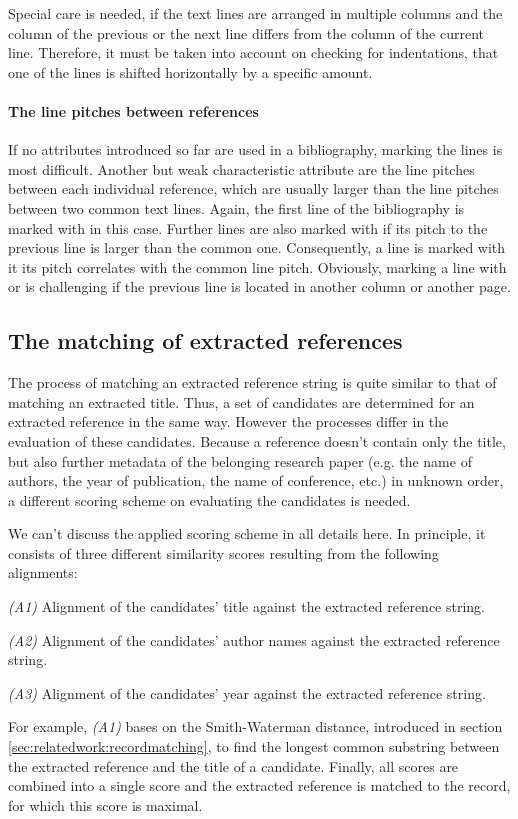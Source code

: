 Special care is needed, if the text lines are arranged in multiple columns and the column of the previous or the next line differs from the column of the current line. Therefore, it must be taken into account on checking for indentations, that one of the lines is shifted horizontally by a specific amount.

\paragraph{The line pitches between references}
If no attributes introduced so far are used in a bibliography, marking the lines is most difficult. Another but weak characteristic attribute are the line pitches between each individual reference, which are usually larger than the line pitches between two common text lines. Again, the first line of the bibliography is marked with  in this case. Further lines are also marked with  if its pitch to the previous line is larger than the common one. Consequently, a line is marked with  it its pitch correlates with the common line pitch. Obviously, marking a line with  or  is challenging if the previous line is located in another column or another page.

\subsection{The matching of extracted references} \label{sec:matching:references}
The process of matching an extracted reference string is quite similar to that of matching an extracted title. Thus, a set of candidates are determined for an extracted reference in the same way. However the processes differ in the evaluation of these candidates. Because a reference doesn't contain only the title, but also further metadata of the belonging research paper (e.g. the name of authors, the year of publication, the name of conference, etc.) in unknown order, a different scoring scheme on evaluating the candidates is needed.

We can't discuss the applied scoring scheme in all details here. In principle, it consists of three different similarity scores resulting from the following alignments: 

\par\medskip\noindent
\textit{(A1)} Alignment of the candidates' title against the extracted reference string.
\par\smallskip\noindent
\textit{(A2)} Alignment of the candidates' author names against the extracted reference string.
\par\smallskip\noindent
\textit{(A3)} Alignment of the candidates' year against the extracted reference string.
\medskip

For example, \textit{(A1)} bases on the Smith-Waterman distance, introduced in section \ref{sec:relatedwork:recordmatching}, to find the longest common substring between the extracted reference and the title of a candidate.
Finally, all scores are combined into a single score and the extracted reference is matched to the record, for which this score is maximal. 